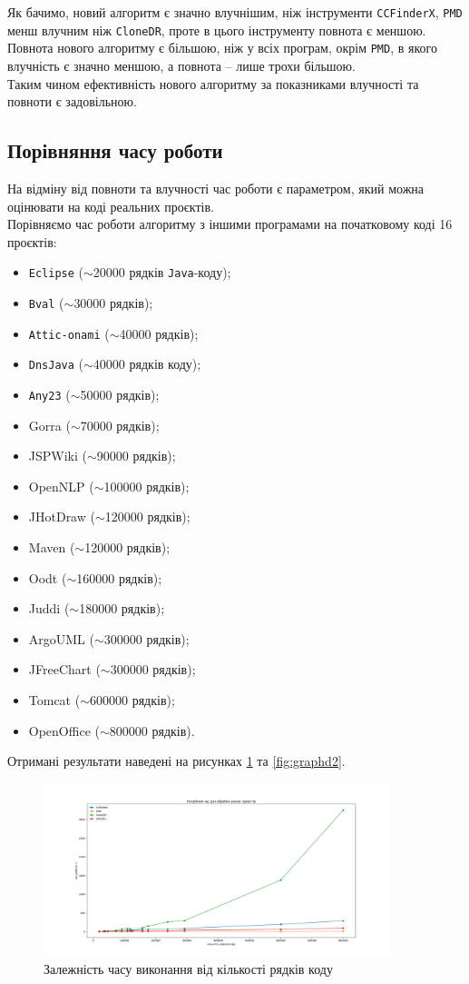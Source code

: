 \documentclass[a4paper, 14pt]{article}
\begin{document}
Як бачимо, новий алгоритм є значно влучнішим, ніж інструменти \verb|CCFinderX|, \verb|PMD| менш влучним ніж \verb|CloneDR|, проте в цього інструменту повнота є меншою. \\
Повнота нового алгоритму є більшою, ніж у всіх програм, окрім \verb|PMD|, в якого влучність є значно меншою, а повнота -- лише трохи більшою. \\
Таким чином ефективність нового алгоритму за показниками влучності та повноти є задовільною.
\subsection{Порівняння часу роботи}
На відміну від повноти та влучності час роботи є параметром, який можна оцінювати на коді реальних проєктів. \\
Порівняємо час роботи алгоритму з іншими програмами на початковому коді 16 проєктів:
\begin{itemize}
\item \verb|Eclipse| ($\sim$20000 рядків \verb|Java|-коду);
\item \verb|Bval| ($\sim$30000 рядків);
\item \verb|Attic-onami| ($\sim$40000 рядків);
\item \verb|DnsJava| ($\sim$40000 рядків коду);
\item \verb|Any23| ($\sim$50000 рядків);
\item Gorra ($\sim$70000 рядків);
\item JSPWiki ($\sim$90000 рядків);
\item OpenNLP ($\sim$100000 рядків);
\item JHotDraw ($\sim$120000 рядків);
\item Maven ($\sim$120000 рядків);
\item Oodt ($\sim$160000 рядків);
\item Juddi ($\sim$180000 рядків);
\item ArgoUML ($\sim$300000 рядків);
\item JFreeChart ($\sim$300000 рядків);
\item Tomcat ($\sim$600000 рядків);
\item OpenOffice ($\sim$800000 рядків).
\end{itemize}
Отримані результати наведені на рисунках \ref{fig:graphd1} та \ref{fig:graphd2}. \\ \newpage
\begin{figure}[h]
    \centering
    \includegraphics[width=0.9\textwidth]{graph1}
		\caption{Залежність часу виконання від кількості рядків коду \label{fig:graphd1}}
\end{figure} \hfill \\
\end{document}
